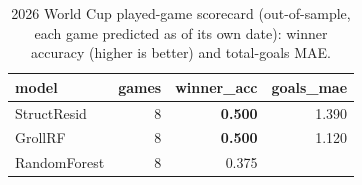 \begin{table}[t]
  \centering
  \caption{2026 World Cup played-game scorecard (out-of-sample, each game predicted as of its own date): winner accuracy (higher is better) and total-goals MAE.}
  \label{tab:wc2026_scorecard}
  \begin{tabular}{lrrr}
  \toprule
  model & games & winner\_acc & goals\_mae \\
  \midrule
  StructResid & 8 & \textbf{0.500} & 1.390 \\
  GrollRF & 8 & \textbf{0.500} & 1.120 \\
  RandomForest & 8 & 0.375 &  \\
  \bottomrule
  \end{tabular}
\end{table}
